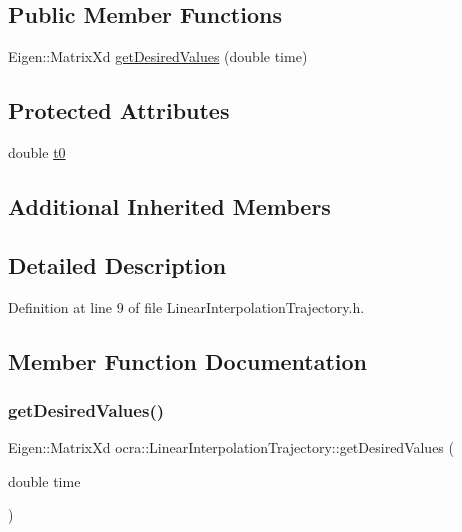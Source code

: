 \subsection*{Public Member Functions}
\begin{DoxyCompactItemize}
\item 
Eigen\+::\+Matrix\+Xd \hyperlink{classocra_1_1LinearInterpolationTrajectory_a342ca41e9c55e46cc40f884b9f7a6412}{get\+Desired\+Values} (double time)
\end{DoxyCompactItemize}
\subsection*{Protected Attributes}
\begin{DoxyCompactItemize}
\item 
double \hyperlink{classocra_1_1LinearInterpolationTrajectory_af29697e472859fbf1cbbf4ad30068222}{t0}
\end{DoxyCompactItemize}
\subsection*{Additional Inherited Members}


\subsection{Detailed Description}


Definition at line 9 of file Linear\+Interpolation\+Trajectory.\+h.



\subsection{Member Function Documentation}
\hypertarget{classocra_1_1LinearInterpolationTrajectory_a342ca41e9c55e46cc40f884b9f7a6412}{}\label{classocra_1_1LinearInterpolationTrajectory_a342ca41e9c55e46cc40f884b9f7a6412} 
\subsubsection{\texorpdfstring{get\+Desired\+Values()}{getDesiredValues()}}
{\footnotesize\ttfamily Eigen\+::\+Matrix\+Xd ocra\+::\+Linear\+Interpolation\+Trajectory\+::get\+Desired\+Values (\begin{DoxyParamCaption}\item[{double}]{time }\end{DoxyParamCaption})\hspace{0.3cm}{\ttfamily [virtual]}}



